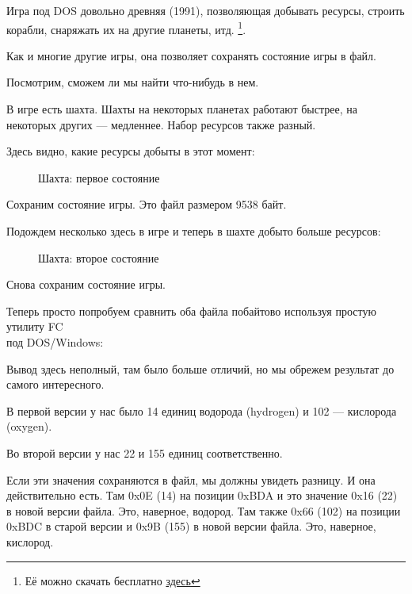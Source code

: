 ﻿
\label{Millenium_DOS_game}

Игра  под DOS довольно древняя (1991), позволяющая
добывать ресурсы, строить корабли, снаряжать их на другие планеты, итд.
\footnote{Её можно скачать бесплатно
\href{http://thehouseofgames.org/index.php?t=10&id=110}{здесь}}.

Как и многие другие игры, она позволяет сохранять состояние игры в файл.

Посмотрим, сможем ли мы найти что-нибудь в нем.

\clearpage
В игре есть шахта.
Шахты на некоторых планетах работают быстрее, на некоторых других --- медленнее. 
Набор ресурсов также разный.

Здесь видно, какие ресурсы добыты в этот момент: 

\begin{figure}[H]
\centering
{}
\caption{Шахта: первое состояние}
\label{fig:mill_1}
\end{figure}

Сохраним состояние игры.
Это файл размером 9538 байт.

Подождем несколько  здесь в игре и теперь в шахте добыто больше ресурсов:

\begin{figure}[H]
\centering
{}
\caption{Шахта: второе состояние}
\label{fig:mill_2}
\end{figure}

Снова сохраним состояние игры.

Теперь просто попробуем сравнить оба файла побайтово используя простую утилиту FC \\
под DOS/Windows:



Вывод здесь неполный, там было больше отличий, но мы обрежем результат до самого интересного.

В первой версии у нас было 14 единиц водорода (hydrogen) и 102 --- кислорода (oxygen).

Во второй версии у нас 22 и 155 единиц соответственно.

Если эти значения сохраняются в файл, мы должны увидеть разницу.
И она действительно есть. 
Там 0x0E (14) на позиции 0xBDA и это значение 0x16 (22) в новой версии файла.
Это, наверное, водород.
Там также 0x66 (102) на позиции 0xBDC в старой версии и 0x9B (155) в новой версии файла. 
Это, наверное, кислород.

